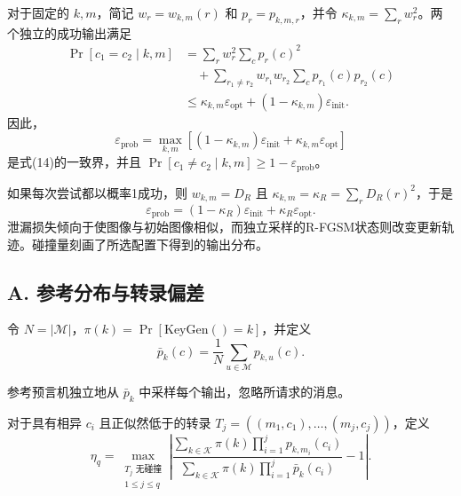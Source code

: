 \documentclass[UTF8,a4paper,zihao=-4,fontset=windows,openany]{ctexbook}
\begin{document}
对于固定的 \(k, m\)，简记 \(w_r = w_{k,m}(r)\) 和 \(p_r = p_{k,m,r}\)，并令 \(\kappa_{k,m} = \sum_r w_r^2\)。两个独立的成功输出满足
\begin{equation}
\begin{aligned}
\Pr[c_1 = c_2 \mid k, m] &= \sum_r w_r^2 \sum_c p_r(c)^2 \\
&\quad + \sum_{r_1 \neq r_2} w_{r_1} w_{r_2} \sum_c p_{r_1}(c) p_{r_2}(c) \\
&\le \kappa_{k,m} \varepsilon_{\mathrm{opt}} + (1 - \kappa_{k,m}) \varepsilon_{\mathrm{init}}.
\end{aligned} \tag{33}
\end{equation}
因此，
\begin{equation}
\varepsilon_{\mathrm{prob}} = \max_{k,m} \left[ (1 - \kappa_{k,m}) \varepsilon_{\mathrm{init}} + \kappa_{k,m} \varepsilon_{\mathrm{opt}} \right] \tag{34}
\end{equation}
是式(14)的一致界，并且 \(\Pr[c_1 \neq c_2 \mid k, m] \ge 1 - \varepsilon_{\mathrm{prob}}\)。

如果每次尝试都以概率1成功，则 \(w_{k,m} = D_R\) 且 \(\kappa_{k,m} = \kappa_R = \sum_r D_R(r)^2\)，于是
\begin{equation}
\varepsilon_{\mathrm{prob}} = (1 - \kappa_R) \varepsilon_{\mathrm{init}} + \kappa_R \varepsilon_{\mathrm{opt}}. \tag{35}
\end{equation}
泄漏损失倾向于使图像与初始图像相似，而独立采样的R-FGSM状态则改变更新轨迹。碰撞量刻画了所选配置下得到的输出分布。

\subsection*{A. 参考分布与转录偏差}

令 \(N = |\mathcal{M}|\)，\(\pi(k) = \Pr[\mathrm{KeyGen}() = k]\)，并定义
\begin{equation}
\bar{p}_k(c) = \frac{1}{N} \sum_{u \in \mathcal{M}} p_{k,u}(c). \tag{36}
\end{equation}

参考预言机独立地从 \(\bar{p}_k\) 中采样每个输出，忽略所请求的消息。

对于具有相异 \(c_i\) 且正似然低于的转录 \(T_j = ((m_1, c_1), \ldots, (m_j, c_j))\)，定义
\begin{equation}
\eta_q = \max_{\substack{T_j \text{ 无碰撞} \\ 1 \le j \le q}} \left| \frac{\sum_{k \in \mathcal{K}} \pi(k) \prod_{i=1}^j p_{k,m_i}(c_i)}{\sum_{k \in \mathcal{K}} \pi(k) \prod_{i=1}^j \bar{p}_k(c_i)} - 1 \right|. \tag{37}
\end{equation}
\end{document}
